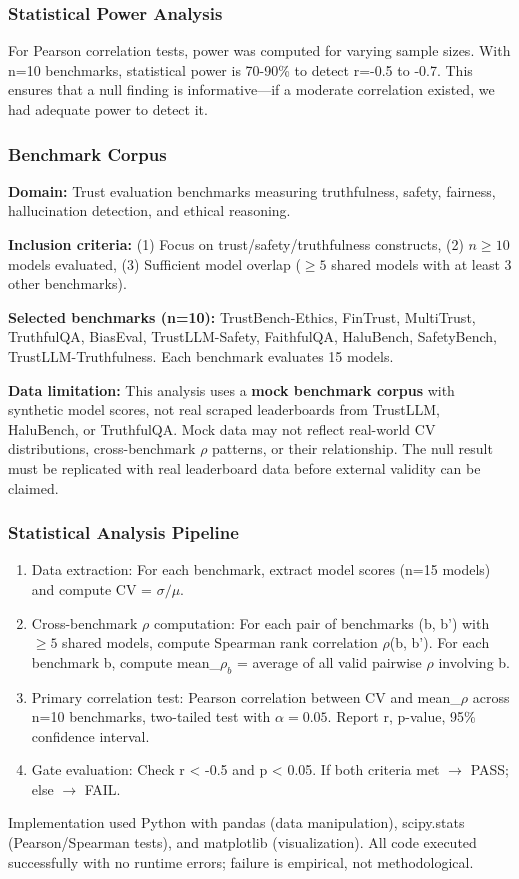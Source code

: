 \subsubsection{Statistical Power Analysis}

For Pearson correlation tests, power was computed for varying sample sizes. With n=10 benchmarks, statistical power is 70-90\% to detect r=-0.5 to -0.7. This ensures that a null finding is informative---if a moderate correlation existed, we had adequate power to detect it.

\subsubsection{Benchmark Corpus}

\textbf{Domain:} Trust evaluation benchmarks measuring truthfulness, safety, fairness, hallucination detection, and ethical reasoning.

\textbf{Inclusion criteria:} (1) Focus on trust/safety/truthfulness constructs, (2) $n\geq 10$ models evaluated, (3) Sufficient model overlap ($\geq 5$ shared models with at least 3 other benchmarks).

\textbf{Selected benchmarks (n=10):} TrustBench-Ethics, FinTrust, MultiTrust, TruthfulQA, BiasEval, TrustLLM-Safety, FaithfulQA, HaluBench, SafetyBench, TrustLLM-Truthfulness. Each benchmark evaluates 15 models.

\textbf{Data limitation:} This analysis uses a \textbf{mock benchmark corpus} with synthetic model scores, not real scraped leaderboards from TrustLLM, HaluBench, or TruthfulQA. Mock data may not reflect real-world CV distributions, cross-benchmark $\rho$ patterns, or their relationship. The null result must be replicated with real leaderboard data before external validity can be claimed.

\subsubsection{Statistical Analysis Pipeline}

\begin{enumerate}
\item Data extraction: For each benchmark, extract model scores (n=15 models) and compute CV = $\sigma / \mu$.
\item Cross-benchmark $\rho$ computation: For each pair of benchmarks (b, b') with $\geq 5$ shared models, compute Spearman rank correlation $\rho$(b, b'). For each benchmark b, compute mean\_$\rho_{b}$ = average of all valid pairwise $\rho$ involving b.
\item Primary correlation test: Pearson correlation between CV and mean\_$\rho$ across n=10 benchmarks, two-tailed test with $\alpha =0.05$. Report r, p-value, 95\% confidence interval.
\item Gate evaluation: Check r < -0.5 and p < 0.05. If both criteria met $\rightarrow$ PASS; else $\rightarrow$ FAIL.
\end{enumerate}

Implementation used Python with pandas (data manipulation), scipy.stats (Pearson/Spearman tests), and matplotlib (visualization). All code executed successfully with no runtime errors; failure is empirical, not methodological.
